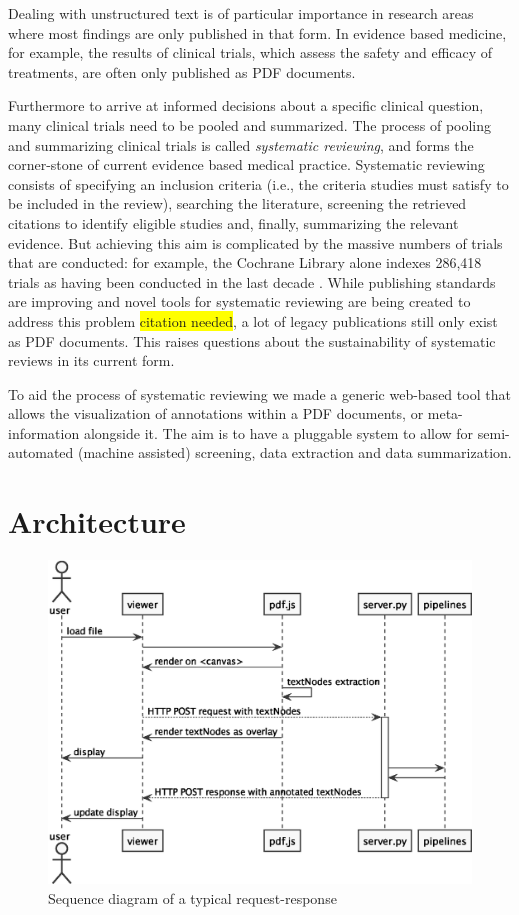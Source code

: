 \documentclass[runningheads,a4paper]{llncs}
\newcommand{\highlight}[1]{\colorbox{yellow}{#1}}
\begin{document}
Dealing with unstructured text is of particular importance in research areas where most findings are only published in that form.
In evidence based medicine, for example, the results of clinical trials, which assess the safety and efficacy of treatments, are often only published as PDF documents.

Furthermore to arrive at informed decisions about a specific clinical question, many clinical trials need to be pooled and summarized.
The process of pooling and summarizing clinical trials is called \emph{systematic reviewing}, and forms the corner-stone of current evidence based medical practice.
Systematic reviewing consists of specifying an inclusion criteria (i.e., the criteria studies must satisfy to be included in the review), searching the literature, screening the retrieved citations to identify eligible studies and, finally, summarizing the relevant evidence.
But achieving this aim is complicated by the massive numbers of trials that are conducted: for example, the Cochrane Library alone indexes 286,418 trials as having been conducted in the last decade \cite{valkenhoef2012}.
While publishing standards are improving and novel tools for systematic reviewing are being created to address this problem \highlight{citation needed}, a lot of legacy publications still only exist as PDF documents.
This raises questions about the sustainability of systematic reviews in its current form.

To aid the process of systematic reviewing we made a generic web-based tool that allows the visualization of annotations within a PDF documents, or meta-information alongside it.
The aim is to have a pluggable system to allow for semi-automated (machine assisted) screening, data extraction and data summarization.
\section{Architecture}
\label{sec-2}

\begin{figure}[htb]
\centering
\includegraphics[width=.9\linewidth]{sequence_diagram.eps}
\caption{\label{fig:sequence}Sequence diagram of a typical request-response}
\end{figure}
\end{document}

